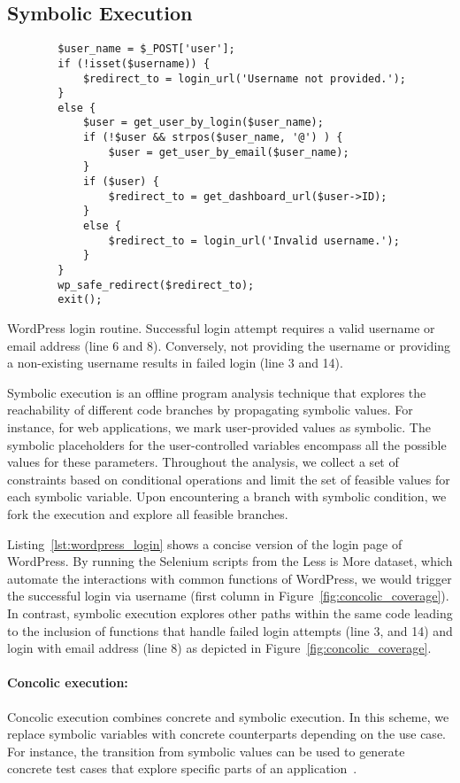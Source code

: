 \subsection{Symbolic Execution}
\label{sec:background_symbolic}
\begin{listing}[t]
	\begin{verbatim}
		$user_name = $_POST['user'];
		if (!isset($username)) {
			$redirect_to = login_url('Username not provided.');
		}
		else {
			$user = get_user_by_login($user_name);
			if (!$user && strpos($user_name, '@') ) {
				$user = get_user_by_email($user_name);
			}
			if ($user) {
				$redirect_to = get_dashboard_url($user->ID);
			}
			else {
				$redirect_to = login_url('Invalid username.');
			}
		}
		wp_safe_redirect($redirect_to);
		exit();
	\end{verbatim}
	\caption{WordPress login routine. Successful login attempt requires a valid username or email address (line 6 and 8). Conversely, not providing the username or providing a non-existing username results in failed login (line 3 and 14).}
	\label{lst:wordpress_login}
\end{listing}

Symbolic execution is an offline program analysis technique that explores the reachability of different code branches by propagating symbolic values. 
For instance, for web applications, we mark user-provided values as symbolic. 
The symbolic placeholders for the user-controlled variables encompass all the possible values for these parameters. 
Throughout the analysis, we collect a set of constraints based on conditional operations and limit the set of feasible values for each symbolic variable. 
Upon encountering a branch with symbolic condition, we fork the execution and explore all feasible branches. 

Listing~\ref{lst:wordpress_login} shows a concise version of the login page of WordPress. 
By running the Selenium scripts from the Less is More dataset, which automate the interactions with common functions of WordPress, we would trigger the successful login via username (first column in Figure~\ref{fig:concolic_coverage}). 
In contrast, symbolic execution explores other paths within the same code leading to the inclusion of functions that handle failed login attempts (line 3, and 14) and login with email address (line 8) as depicted in Figure~\ref{fig:concolic_coverage}. 

\paragraph{Concolic execution:} 
Concolic execution combines concrete and symbolic execution. 
In this scheme, we replace symbolic variables with concrete counterparts depending on the use case. 
For instance, the transition from symbolic values can be used to generate concrete test cases that explore specific parts of an application~\cite{10.1145/1081706.1081750}. 

